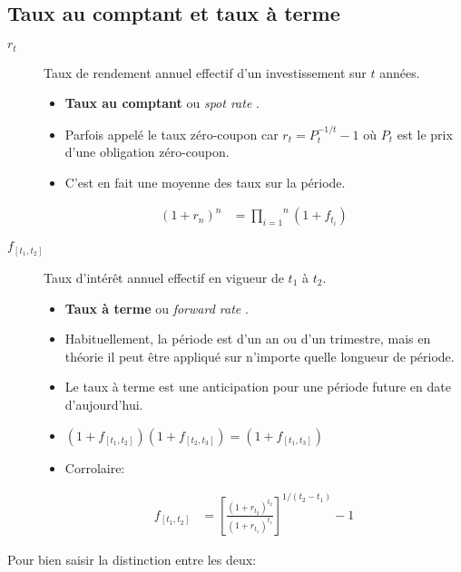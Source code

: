 \documentclass[10pt, french]{article}
\begin{document}
\begin{multicols*}{2}
\columnbreak

\subsection*{Taux au comptant et taux à terme}

\begin{distributions}[Notation]
\begin{description}
	\item[$r_{t}$]	Taux de rendement annuel effectif d'un investissement sur $t$ années.
		\begin{itemize}[leftmargin = *]
		\item	\textbf{Taux au comptant} ou \og \textit{spot rate} \fg{}.
		\item	Parfois appelé le taux zéro-coupon car $r_{t} = P_{t}^{-1/t} - 1$ où $P_{t}$ est le prix d'une obligation zéro-coupon.
		\item	C'est en fait une moyenne des taux sur la période.
		\end{itemize}
		\begin{align*}
		(1 + r_{n})^{n} 
		&=	\overset{n}{\underset{i = 1}{\prod}} (1 + f_{t_{i}})
		\end{align*}
	\item[$f_{[t_{1}, t_{2}]}$]	Taux d'intérêt annuel effectif en vigueur de $t_{1}$ à $t_{2}$.
		\begin{itemize}[leftmargin = *]
		\item	\textbf{Taux à terme} ou \og \textit{forward rate} \fg{}.
		\item	Habituellement, la période est d'un an ou d'un trimestre, mais en théorie il peut être appliqué sur n'importe quelle longueur de période.
		\item	Le taux à terme est une anticipation pour une période future en date d'aujourd'hui.
		\item	$(1 + f_{[t_{1}, t_{2}]})(1 + f_{[t_{2}, t_{3}]}) = (1 + f_{[t_{1}, t_{3}]})$
		\item	Corrolaire:
		\end{itemize}
		\begin{align*}
		f_{[t_{1}, t_{2}]}
		&=	\left[\frac{(1 + r_{t_{2}})^{t_{2}}}{(1 + r_{t_{1}})^{t_{1}}}\right]^{1/(t_{2} - t_{1})} - 1
		\end{align*}			
\end{description}
Pour bien saisir la distinction entre les deux:
\begin{center}




\end{center}
\end{distributions}
\end{multicols*}
\end{document}
